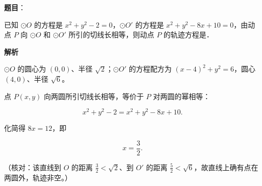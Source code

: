 \begin{answer}

\textbf{题目}：

已知 $\odot O$ 的方程是 $x^2+y^2-2=0$，$\odot O'$ 的方程是 $x^2+y^2-8x+10=0$，由动点 $P$ 向 $\odot O$ 和 $\odot O'$ 所引的切线长相等，则动点 $P$ 的轨迹方程是\gkblank{}．

\textbf{解析}

$\odot O$ 的圆心为 $(0,0)$、半径 $\sqrt2$；$\odot O'$ 的方程配方为 $(x-4)^2+y^2=6$，圆心 $(4,0)$、半径 $\sqrt6$。

点 $P(x,y)$ 向两圆所引切线长相等，等价于 $P$ 对两圆的幂相等：

\nopagebreak[4]
\[x^2+y^2-2=x^2+y^2-8x+10 .\]

化简得 $8x=12$，即

\nopagebreak[4]
\[x=\frac32 .\]

（核对：该直线到 $O$ 的距离 $\frac32<\sqrt2$、到 $O'$ 的距离 $\frac52<\sqrt6$，故直线上确有点在两圆外，轨迹非空。）


\end{answer}
